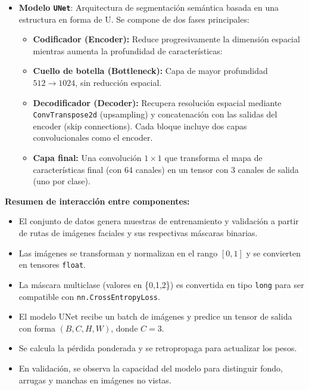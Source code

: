 \begin{enumerate}
\begin{itemize}
\begin{itemize}
    \item \textbf{Modelo \texttt{UNet}}: Arquitectura de segmentación semántica basada en una estructura en forma de U. Se compone de dos fases principales:
    \begin{itemize}
        \item \textbf{Codificador (Encoder):} Reduce progresivamente la dimensión espacial mientras aumenta la profundidad de características:
        \item \textbf{Cuello de botella (Bottleneck):} Capa de mayor profundidad \(512 \rightarrow 1024\), sin reducción espacial.
        \item \textbf{Decodificador (Decoder):} Recupera resolución espacial mediante \texttt{ConvTranspose2d} (upsampling) y concatenación con las salidas del encoder (skip connections). Cada bloque incluye dos capas convolucionales como el encoder.
        \item \textbf{Capa final:} Una convolución \(1 \times 1\) que transforma el mapa de características final (con 64 canales) en un tensor con 3 canales de salida (uno por clase).
    \end{itemize}
\end{itemize}
\end{itemize}

\vspace{1em}
\textbf{Resumen de interacción entre componentes:}

\begin{itemize}
    \item El conjunto de datos genera muestras de entrenamiento y validación a partir de rutas de imágenes faciales y sus respectivas máscaras binarias.
    \item Las imágenes se transforman y normalizan en el rango \([0, 1]\) y se convierten en tensores \texttt{float}.
    \item La máscara multiclase (valores en \{0,1,2\}) es convertida en tipo \texttt{long} para ser compatible con \texttt{nn.CrossEntropyLoss}.
    \item El modelo UNet recibe un batch de imágenes y predice un tensor de salida con forma \((B, C, H, W)\), donde \(C = 3\).
    \item Se calcula la pérdida ponderada y se retropropaga para actualizar los pesos.
    \item En validación, se observa la capacidad del modelo para distinguir fondo, arrugas y manchas en imágenes no vistas.
\end{itemize}


\end{enumerate}
